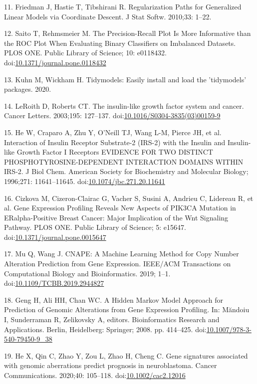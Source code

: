 \documentclass[10pt,letterpaper]{article}
\begin{document}
\leavevmode\hypertarget{ref-friedmanRegularizationPathsGeneralized2010}{}%
11. Friedman J, Hastie T, Tibshirani R. Regularization Paths for
Generalized Linear Models via Coordinate Descent. J Stat Softw. 2010;33:
1--22.

\leavevmode\hypertarget{ref-saitoPrecisionRecallPlotMore2015}{}%
12. Saito T, Rehmsmeier M. The Precision-Recall Plot Is More Informative
than the ROC Plot When Evaluating Binary Classifiers on Imbalanced
Datasets. PLOS ONE. Public Library of Science; 10: e0118432.
doi:\href{https://doi.org/10.1371/journal.pone.0118432}{10.1371/journal.pone.0118432}

\leavevmode\hypertarget{ref-kuhnTidymodelsEasilyInstall2020}{}%
13. Kuhn M, Wickham H. Tidymodels: Easily install and load the
'tidymodels' packages. 2020.

\leavevmode\hypertarget{ref-leroithInsulinlikeGrowthFactor2003}{}%
14. LeRoith D, Roberts CT. The insulin-like growth factor system and
cancer. Cancer Letters. 2003;195: 127--137.
doi:\href{https://doi.org/10.1016/S0304-3835(03)00159-9}{10.1016/S0304-3835(03)00159-9}

\leavevmode\hypertarget{ref-heInteractionInsulinReceptor1996}{}%
15. He W, Craparo A, Zhu Y, O'Neill TJ, Wang L-M, Pierce JH, et al.
Interaction of Insulin Receptor Substrate-2 (IRS-2) with the Insulin and
Insulin-like Growth Factor I Receptors EVIDENCE FOR TWO DISTINCT
PHOSPHOTYROSINE-DEPENDENT INTERACTION DOMAINS WITHIN IRS-2. J Biol Chem.
American Society for Biochemistry and Molecular Biology; 1996;271:
11641--11645.
doi:\href{https://doi.org/10.1074/jbc.271.20.11641}{10.1074/jbc.271.20.11641}

\leavevmode\hypertarget{ref-cizkovaGeneExpressionProfiling2010}{}%
16. Cizkova M, Cizeron-Clairac G, Vacher S, Susini A, Andrieu C,
Lidereau R, et al. Gene Expression Profiling Reveals New Aspects of
PIK3CA Mutation in ERalpha-Positive Breast Cancer: Major Implication of
the Wnt Signaling Pathway. PLOS ONE. Public Library of Science; 5:
e15647.
doi:\href{https://doi.org/10.1371/journal.pone.0015647}{10.1371/journal.pone.0015647}

\leavevmode\hypertarget{ref-muCNAPEMachineLearning2019}{}%
17. Mu Q, Wang J. CNAPE: A Machine Learning Method for Copy Number
Alteration Prediction from Gene Expression. IEEE/ACM Transactions on
Computational Biology and Bioinformatics. 2019; 1--1.
doi:\href{https://doi.org/10.1109/TCBB.2019.2944827}{10.1109/TCBB.2019.2944827}

\leavevmode\hypertarget{ref-gengHiddenMarkovModel2008}{}%
18. Geng H, Ali HH, Chan WC. A Hidden Markov Model Approach for
Prediction of Genomic Alterations from Gene Expression Profiling. In:
Măndoiu I, Sunderraman R, Zelikovsky A, editors. Bioinformatics Research
and Applications. Berlin, Heidelberg: Springer; 2008. pp. 414--425.
doi:\href{https://doi.org/10.1007/978-3-540-79450-9_38}{10.1007/978-3-540-79450-9\_38}

\leavevmode\hypertarget{ref-heGeneSignaturesAssociated2020}{}%
19. He X, Qin C, Zhao Y, Zou L, Zhao H, Cheng C. Gene signatures
associated with genomic aberrations predict prognosis in neuroblastoma.
Cancer Communications. 2020;40: 105--118.
doi:\href{https://doi.org/10.1002/cac2.12016}{10.1002/cac2.12016}

\nolinenumbers
\end{document}
